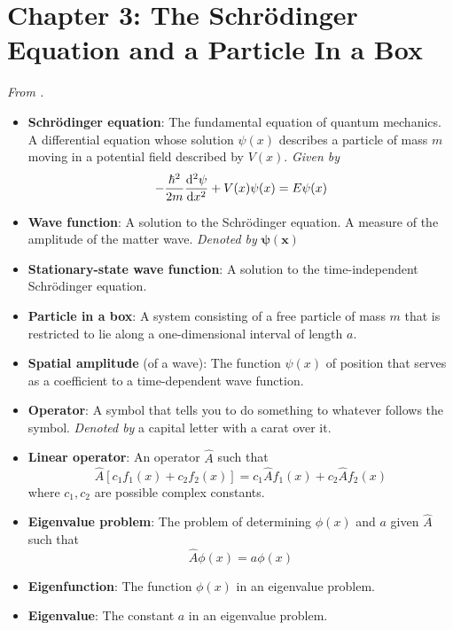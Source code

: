 \documentclass[../notes.tex]{subfiles}
\begin{document}
\section{Chapter 3: The Schr\"{o}dinger Equation and a Particle In a Box}
\emph{From \textcite{bib:McQuarrieSimon}.}
\begin{itemize}
    \item \textbf{Schr\"{o}dinger equation}: The fundamental equation of quantum mechanics. A differential equation whose solution $\psi(x)$ describes a particle of mass $m$ moving in a potential field described by $V(x)$. \emph{Given by}
    \begin{equation*}
        -\frac{\hbar^2}{2m}\dv[2]{\psi}{x}+V(x)\psi(x) = E\psi(x)
    \end{equation*}
    \item \textbf{Wave function}: A solution to the Schr\"{o}dinger equation. A measure of the amplitude of the matter wave. \emph{Denoted by} $\bm{\psi(x)}$
    \item \textbf{Stationary-state wave function}: A solution to the time-independent Schr\"{o}dinger equation.
    \item \textbf{Particle in a box}: A system consisting of a free particle of mass $m$ that is restricted to lie along a one-dimensional interval of length $a$.
    \item \textbf{Spatial amplitude} (of a wave): The function $\psi(x)$ of position that serves as a coefficient to a time-dependent wave function.
    \item \textbf{Operator}: A symbol that tells you to do something to whatever follows the symbol. \emph{Denoted by} a capital letter with a carat over it.
    \item \textbf{Linear operator}: An operator $\hat{A}$ such that
    \begin{equation*}
        \hat{A}[c_1f_1(x)+c_2f_2(x)] = c_1\hat{A}f_1(x)+c_2\hat{A}f_2(x)
    \end{equation*}
    where $c_1,c_2$ are possible complex constants.
    \item \textbf{Eigenvalue problem}: The problem of determining $\phi(x)$ and $a$ given $\hat{A}$ such that
    \begin{equation*}
        \hat{A}\phi(x) = a\phi(x)
    \end{equation*}
    \item \textbf{Eigenfunction}: The function $\phi(x)$ in an eigenvalue problem.
    \item \textbf{Eigenvalue}: The constant $a$ in an eigenvalue problem.

\end{itemize}
\end{document}
